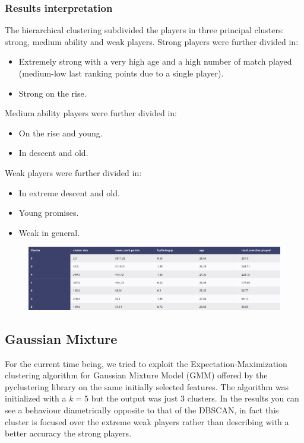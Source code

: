 \documentclass{article}
\begin{document}
\subsubsection{Results interpretation}
The hierarchical clustering subdivided the players in three principal clusters: strong, medium ability and weak players. Strong players were further divided in:
\begin{itemize}
    \item Extremely strong with a very high age and a high number of match played (medium-low last ranking points due to a single player).
    \item Strong on the rise. 
\end{itemize}
Medium ability players were further divided in:
\begin{itemize}
    \item On the rise and young.
    \item In descent and old. 
\end{itemize}
Weak players were further divided in:
\begin{itemize}
    \item In extreme descent and old.
    \item Young promises.
    \item Weak in general.
\end{itemize}
	
\begin{figure}[h]
\centering
\includegraphics[width=.6\textwidth]{plots/hierarchical/hierarchical_results}
\label{fig:hierarchical_results}
\end{figure}

\subsection{Gaussian Mixture}
For the current time being, we tried to exploit the Expectation-Maximization clustering algorithm for Gaussian Mixture Model (GMM) offered by the pyclustering library on the same initially selected features. The algorithm was initialized with a $k=5$ but the output was just $3$ clusters. In the results you can see a behaviour diametrically opposite to that of the DBSCAN, in fact this cluster is focused over the extreme weak players rather than describing with a better accuracy the strong players.  
\end{document}
